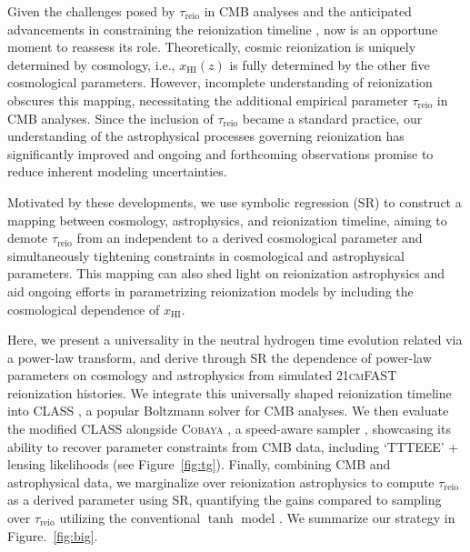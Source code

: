 \documentclass[12pt]{article}
\newcommand{\HI}{\mathrm{HI}}
\newcommand{\reio}{\mathrm{reio}}
\begin{document}
Given the challenges posed by $\tau_\reio$ in CMB analyses and the
anticipated advancements in constraining the reionization
timeline \cite{Montero2021, Hera2022}, now is an opportune moment to
reassess its role.
Theoretically, cosmic reionization is uniquely determined by cosmology,
i.e., $x_\HI(z)$ is fully determined by the other five cosmological
parameters.
However, incomplete understanding of reionization obscures this mapping,
necessitating the additional empirical parameter $\tau_\reio$ in CMB
analyses.
Since the inclusion of $\tau_\reio$ became a standard practice, our
understanding of the astrophysical processes governing reionization has
significantly improved \cite{Gnedin2022, Kannan2022,Murray2020, Fan2023}
and ongoing and forthcoming observations promise to reduce inherent
modeling uncertainties.

Motivated by these developments, we use symbolic regression (SR)
\cite{Cranmer2023, Graham2013} to construct a mapping between cosmology,
astrophysics, and reionization timeline, aiming to demote $\tau_\reio$
from an independent to a derived cosmological parameter and
simultaneously tightening constraints in cosmological and astrophysical
parameters.
This mapping can also shed light on reionization astrophysics and aid
ongoing efforts in parametrizing reionization models \cite{Trac2018,
Trac2022, Paoletti2024} by including the cosmological dependence of
$x_\HI$.

Here, we present a universality in the neutral hydrogen time evolution
related via a power-law transform, and derive through SR the
dependence of power-law parameters on cosmology and astrophysics from
simulated \textsc{21cmFAST} \cite{MesingerEtAl2011, Murray2020}
reionization histories.
We integrate this universally shaped reionization timeline into
\textsc{CLASS} \cite{Blas2011}, a popular Boltzmann solver for CMB
analyses.
We then evaluate the modified \textsc{CLASS} alongside \textsc{Cobaya}
\cite{Torrado2020}, a speed-aware sampler \cite{Lewis2002,
Lewis2013}, showcasing its ability to
recover parameter constraints from CMB data, including `TTTEEE' +
lensing likelihoods \cite{Planck2020c, Planck2020d} (see Figure~\ref{fig:tg}).
Finally, combining CMB and astrophysical data, we marginalize over
reionization astrophysics to compute $\tau_\reio$ as a derived parameter
using SR, quantifying the gains compared to sampling over $\tau_\reio$
utilizing the conventional $\tanh$ model \cite{Lewis2008}.
We summarize our strategy in Figure.~\ref{fig:big}.
\end{document}
